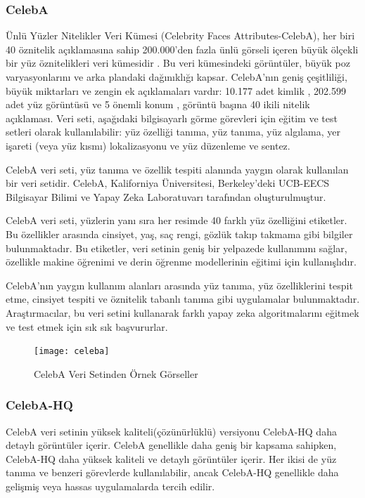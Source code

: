 \documentclass[12pt, a4paper]{article}
\begin{document}
	\subsubsection{CelebA}
	Ünlü Yüzler Nitelikler Veri Kümesi (Celebrity Faces Attributes-CelebA), her biri 40 öznitelik açıklamasına sahip 200.000'den fazla ünlü görseli içeren büyük ölçekli bir yüz öznitelikleri veri kümesidir . Bu veri kümesindeki görüntüler, büyük poz varyasyonlarını ve arka plandaki dağınıklığı kapsar. CelebA'nın geniş çeşitliliği, büyük miktarları ve zengin ek açıklamaları vardır:
	10.177 adet kimlik ,
	202.599 adet yüz görüntüsü ve
	5 önemli konum , görüntü başına 40 ikili nitelik açıklaması.
	Veri seti, aşağıdaki bilgisayarlı görme görevleri için eğitim ve test setleri olarak kullanılabilir: yüz özelliği tanıma, yüz tanıma, yüz algılama, yer işareti (veya yüz kısmı) lokalizasyonu ve yüz düzenleme ve sentez\cite{liu2015faceattributes}.
	
	CelebA veri seti, yüz tanıma ve özellik tespiti alanında yaygın olarak kullanılan bir veri setidir. CelebA, Kaliforniya Üniversitesi, Berkeley'deki UCB-EECS Bilgisayar Bilimi ve Yapay Zeka Laboratuvarı tarafından oluşturulmuştur.
	
	CelebA veri seti, yüzlerin yanı sıra her resimde 40 farklı yüz özelliğini etiketler. Bu özellikler arasında cinsiyet, yaş, saç rengi, gözlük takıp takmama gibi bilgiler bulunmaktadır. Bu etiketler, veri setinin geniş bir yelpazede kullanımını sağlar, özellikle makine öğrenimi ve derin öğrenme modellerinin eğitimi için kullanışlıdır.
	
	CelebA'nın yaygın kullanım alanları arasında yüz tanıma, yüz özelliklerini tespit etme, cinsiyet tespiti ve öznitelik tabanlı tanıma gibi uygulamalar bulunmaktadır. Araştırmacılar, bu veri setini kullanarak farklı yapay zeka algoritmalarını eğitmek ve test etmek için sık sık başvururlar\cite{yavuz2021yfcc}.
	
	\begin{figure}[h]
		\centering
		\texttt{[image: celeba]}
		\label{celeba}
		\caption{CelebA Veri Setinden Örnek Görseller\cite{CelebA-2024-04-04}}
	\end{figure}
		\FloatBarrier
	\subsubsection{CelebA-HQ}
	CelebA veri setinin yüksek kaliteli(çözünürlüklü) versiyonu CelebA-HQ daha detaylı görüntüler içerir. CelebA genellikle daha geniş bir kapsama sahipken, CelebA-HQ daha yüksek kaliteli ve detaylı görüntüler içerir. Her ikisi de yüz tanıma ve benzeri görevlerde kullanılabilir, ancak CelebA-HQ genellikle daha gelişmiş veya hassas uygulamalarda tercih edilir.
	
\end{document}
